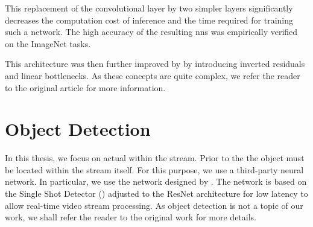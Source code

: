 This replacement of the convolutional layer by two simpler layers significantly decreases the computation cost of inference and the time required for training such a network. The high accuracy of the resulting \glspl{nn} was empirically verified on the ImageNet tasks.

This architecture was then further improved by \cite{mobilenetv2} by introducing inverted residuals and linear bottlenecks. As these concepts are quite complex, we refer the reader to the original article for more information.


\section{Object Detection}

In this thesis, we focus on actual \reid{} within the stream. Prior to the \reid{} the object must be located within the stream itself. For this purpose, we use a third-party neural network. In particular, we use the network designed by \cite{dobransky2019}. The network is based on the Single Shot Detector (\cite{liu2016ssd}) adjusted to the ResNet architecture for low latency to allow real-time video stream processing. As object detection is not a topic of our work, we shall refer the reader to the original work for more details.

